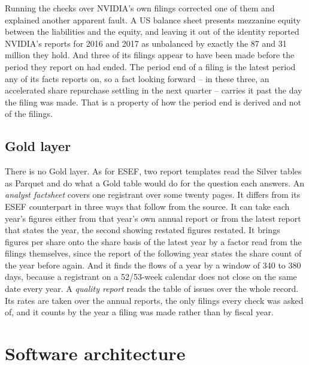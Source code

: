 Running the checks over NVIDIA's own filings corrected one of them and explained another apparent fault. A US balance sheet presents mezzanine equity between the liabilities and the equity, and leaving it out of the identity reported NVIDIA's reports for 2016 and 2017 as unbalanced by exactly the 87 and 31 million they hold. And three of its filings appear to have been made before the period they report on had ended. The period end of a filing is the latest period any of its facts reports on, so a fact looking forward -- in these three, an accelerated share repurchase settling in the next quarter -- carries it past the day the filing was made. That is a property of how the period end is derived and not of the filings.

\subsection{Gold layer}

There is no Gold layer. As for ESEF, two report templates read the Silver tables as Parquet and do what a Gold table would do for the question each answers. An \emph{analyst factsheet} covers one registrant over some twenty pages. It differs from its ESEF counterpart in three ways that follow from the source. It can take each year's figures either from that year's own annual report or from the latest report that states the year, the second showing restated figures restated. It brings figures per share onto the share basis of the latest year by a factor read from the filings themselves, since the report of the following year states the share count of the year before again. And it finds the flows of a year by a window of 340 to 380 days, because a registrant on a 52/53-week calendar does not close on the same date every year. A \emph{quality report} reads the table of issues over the whole record. Its rates are taken over the annual reports, the only filings every check was asked of, and it counts by the year a filing was made rather than by fiscal year.

\section{Software architecture}

